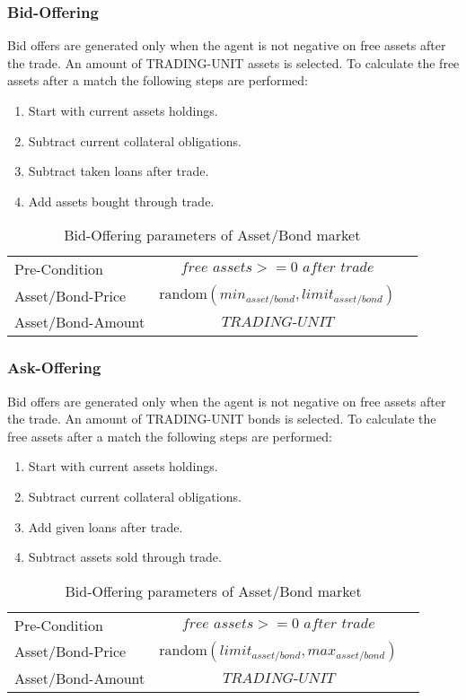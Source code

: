 \documentclass[Bachelorarbeit.tex]{subfiles}
\begin{document}
\subsubsection{Bid-Offering}
Bid offers are generated only when the agent is not negative on free assets after the trade. An amount of TRADING-UNIT assets is selected. To calculate the free assets after a match the following steps are performed:

\begin{enumerate}
\item Start with current assets holdings.
\item Subtract current collateral obligations.
\item Subtract taken loans after trade.
\item Add assets bought through trade.
\end{enumerate}

\begin{table}[H]
	\centering
	\caption{Bid-Offering parameters of Asset/Bond market}
	\begin{tabular} { l c r }
		\hline
		Pre-Condition & $\textit{free assets} >= \textit{0 after trade}$  \\
		Asset/Bond-Price & $\mathrm{random}(min_{asset/bond}, limit_{asset/bond})$ \\
		Asset/Bond-Amount & $\textit{TRADING-UNIT}$ \\
		\hline
	\end{tabular}
\end{table}

\subsubsection{Ask-Offering}
Bid offers are generated only when the agent is not negative on free assets after the trade. An amount of TRADING-UNIT bonds is selected. To calculate the free assets after a match the following steps are performed:

\begin{enumerate}
\item Start with current assets holdings.
\item Subtract current collateral obligations.
\item Add given loans after trade.
\item Subtract assets sold through trade.
\end{enumerate}

\begin{table}[H]
	\centering
	\caption{Bid-Offering parameters of Asset/Bond market}
	\begin{tabular} { l c r }
		\hline
		Pre-Condition & $\textit{free assets} >= \textit{0 after trade}$  \\
		Asset/Bond-Price & $\mathrm{random}(limit_{asset/bond}, max_{asset/bond})$ \\
		Asset/Bond-Amount & $\textit{TRADING-UNIT}$ \\
		\hline
	\end{tabular}
\end{table}
\end{document}
